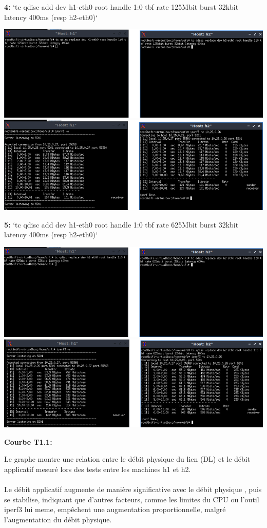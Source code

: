 \vspace{1cm}
\textbf{4:} `tc qdisc add dev h1-eth0 root handle 1:0 tbf rate 125Mbit burst 32kbit latency 400ms (resp h2-eth0)`
\begin{center}
    \includegraphics[width=1\textwidth]{./images/ValuerMoyenneCommande.png} \\
    \includegraphics[width=1\textwidth]{./images/ValeurMoyenneResultat.png}
\end{center}
\vspace{1cm}
\hspace{0.5cm}\textbf{5:} `tc qdisc add dev h1-eth0 root handle 1:0 tbf rate 625Mbit burst 32kbit latency 400ms (resp h2-eth0)`
\begin{center}
    \includegraphics[width=1\textwidth]{./images/ValuerDefautCommande.png} 
    \includegraphics[width=1\textwidth]{./images/ValuerDefautResultat.png}
\end{center}
\textbf{Courbe T1.1:} 

Le graphe montre une relation entre le débit physique du lien (DL) et le débit applicatif mesuré lors des tests entre les machines h1 et h2.
\\
\\Le débit applicatif augmente de manière significative avec le débit physique , puis se stabilise, indiquant que d'autres facteurs, comme les limites du CPU ou l'outil iperf3 lui meme, empêchent une augmentation proportionnelle, malgré l'augmentation du débit physique.
